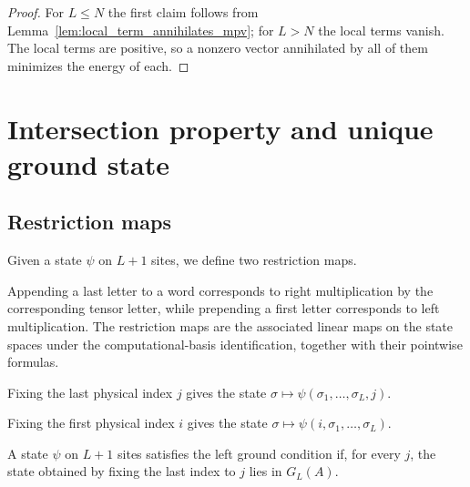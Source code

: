 \begin{proof}
    \leanok
    For $L\le N$ the first claim follows from
    Lemma~\ref{lem:local_term_annihilates_mpv}; for $L>N$ the local terms
    vanish. The local terms are positive, so a nonzero vector annihilated by
    all of them minimizes the energy of each.
\end{proof}

\section{Intersection property and unique ground state}\label{sec:intersection_unique}


\subsection{Restriction maps}

Given a state $\psi$ on $L+1$ sites, we define two restriction maps.

\begin{remark}
    \leanok
    Appending a last letter to a word corresponds to right multiplication by the
    corresponding tensor letter, while prepending a first letter corresponds to
    left multiplication. The restriction maps are the associated linear maps on
    the state spaces under the computational-basis identification, together with
    their pointwise formulas.
\end{remark}

\begin{definition}\label{def:restrict_last}
    \leanok
    Fixing the last physical index $j$ gives the state
    $\sigma\mapsto\psi(\sigma_1,\ldots,\sigma_L,j)$.
\end{definition}

\begin{definition}\label{def:restrict_first}
    \leanok
    Fixing the first physical index $i$ gives the state
    $\sigma\mapsto\psi(i,\sigma_1,\ldots,\sigma_L)$.
\end{definition}

\begin{definition}\label{def:in_left_ground}
    \leanok
    A state $\psi$ on $L+1$ sites satisfies the left ground condition if, for
    every $j$, the state obtained by fixing the last index to $j$ lies in
    $G_L(A)$.
\end{definition}

